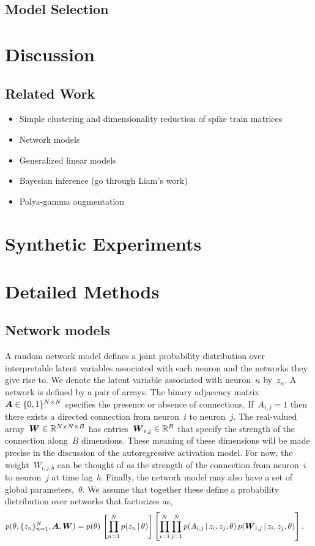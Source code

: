 \subsection{Model Selection}


\section{Discussion}

\subsection{Related Work}
\begin{itemize}
\item Simple clustering and dimensionality reduction of spike train matrices
\item Network models
\item Generalized linear models
\item Bayesian inference (go through Liam's work)
\item Polya-gamma augmentation
\end{itemize}


\section{Synthetic Experiments}

\section{Detailed Methods}

\subsection{Network models}
A random network model defines a joint probability distribution over interpretable latent variables associated with each neuron and the networks they give rise to. 
We denote the latent variable associated with neuron~$n$ by~$z_n$.  
A network is defined by a pair of arrays. 
The binary adjacency matrix~$\boldsymbol{A} \in \{0,1\}^{N\times N}$ specifies the presence or absence of connections. 
If~$A_{i,j}=1$ then there exists a directed connection from neuron~$i$ to neuron~$j$.
The real-valued array~$\boldsymbol{W} \in \mathbb{R}^{N \times N \times B}$ has entries~$\boldsymbol{W}_{i,j} \in \mathbb{R}^B$ that specify the strength of the connection along~$B$ dimensions.
These meaning of these dimensions will be made precise in the discussion of the autoregressive activation model.
For now, the weight~$W_{i,j,b}$ can be thought of as the strength of the connection from neuron~$i$ to neuron~$j$ at time lag~$b$.
Finally, the network model may also have a set of global parameters,~$\theta$. 
We assume that together these define a probability distribution over networks that factorizes as,
\begin{align}
p(\theta, \{z_n\}_{n=1}^N, \boldsymbol{A}, \boldsymbol{W}) &= 
p(\theta) \, 
\left[ \prod_{n=1}^N p(z_n \,|\, \theta) \right]  
\left[ \prod_{i=1}^N \prod_{j=1}^N p(A_{i,j} \,|\, z_{i}, z_{j}, \theta) \, 
p(\boldsymbol{W}_{i,j} \,|\, z_{i}, z_{j}, \theta) \right].
\end{align}

